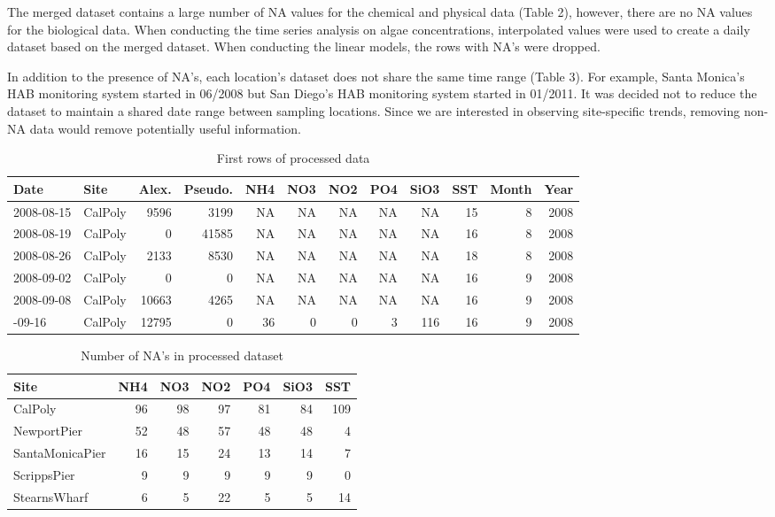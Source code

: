 \documentclass[
  12pt,
]{article}
\begin{document}
The merged dataset contains a large number of NA values for the chemical
and physical data (Table 2), however, there are no NA values for the
biological data. When conducting the time series analysis on algae
concentrations, interpolated values were used to create a daily dataset
based on the merged dataset. When conducting the linear models, the rows
with NA's were dropped.

In addition to the presence of NA's, each location's dataset does not
share the same time range (Table 3). For example, Santa Monica's HAB
monitoring system started in 06/2008 but San Diego's HAB monitoring
system started in 01/2011. It was decided not to reduce the dataset to
maintain a shared date range between sampling locations. Since we are
interested in observing site-specific trends, removing non-NA data would
remove potentially useful information.

\newpage

\begingroup\fontsize{10}{12}\selectfont

\begin{longtable}[t]{llrrrrrrrrrr}
\caption{\label{tab:prelim data analysis}First rows of processed data}\\
\toprule
Date & Site & Alex. & Pseudo. & NH4 & NO3 & NO2 & PO4 & SiO3 & SST & Month & Year\\
\midrule
2008-08-15 & CalPoly & 9596 & 3199 & NA & NA & NA & NA & NA & 15 & 8 & 2008\\
2008-08-19 & CalPoly & 0 & 41585 & NA & NA & NA & NA & NA & 16 & 8 & 2008\\
2008-08-26 & CalPoly & 2133 & 8530 & NA & NA & NA & NA & NA & 18 & 8 & 2008\\
2008-09-02 & CalPoly & 0 & 0 & NA & NA & NA & NA & NA & 16 & 9 & 2008\\
2008-09-08 & CalPoly & 10663 & 4265 & NA & NA & NA & NA & NA & 16 & 9 & 2008\\
\addlinespace
2008-09-16 & CalPoly & 12795 & 0 & 36 & 0 & 0 & 3 & 116 & 16 & 9 & 2008\\
\bottomrule
\end{longtable}
\endgroup{}

\begin{longtable}[t]{lrrrrrr}
\caption{\label{tab:prelim data analysis}Number of NA's in processed dataset}\\
\toprule
Site & NH4 & NO3 & NO2 & PO4 & SiO3 & SST\\
\midrule
CalPoly & 96 & 98 & 97 & 81 & 84 & 109\\
NewportPier & 52 & 48 & 57 & 48 & 48 & 4\\
SantaMonicaPier & 16 & 15 & 24 & 13 & 14 & 7\\
ScrippsPier & 9 & 9 & 9 & 9 & 9 & 0\\
StearnsWharf & 6 & 5 & 22 & 5 & 5 & 14\\
\bottomrule
\end{longtable}
\end{document}
